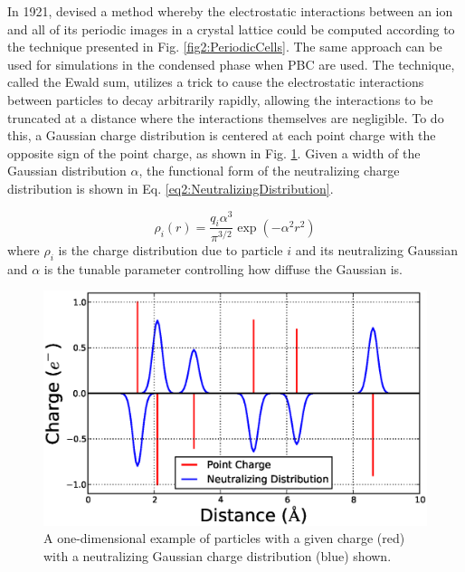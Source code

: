 In 1921, \citeauthor{Ewald_AnnPhys_1921_v64_p253} devised a method whereby the
electrostatic interactions between an ion and all of its periodic images in a
crystal lattice could be computed according to the technique presented in Fig.
\ref{fig2:PeriodicCells}. \cite{Ewald_AnnPhys_1921_v64_p253} The same approach
can be used for simulations in the condensed phase when PBC are used.  The
technique, called the Ewald sum, utilizes a trick to cause the electrostatic
interactions between particles to decay arbitrarily rapidly, allowing the
interactions to be truncated at a distance where the interactions themselves are
negligible. To do this, a Gaussian charge distribution is centered at each point
charge with the opposite sign of the point charge, as shown in Fig.
\ref{fig2:Ewald}. Given a width of the Gaussian distribution $\alpha$, the
functional form of the neutralizing charge distribution is shown in Eq.
\ref{eq2:NeutralizingDistribution}.

\begin{equation}
   \rho_i(r) = \frac{q_i \alpha ^ 3} {\pi ^ {3/2}} \exp \left( -\alpha ^ 2 r^2
               \right)
   \label{eq2:NeutralizingDistribution}
\end{equation}
where $\rho_i$ is the charge distribution due to particle $i$ and its
neutralizing Gaussian and $\alpha$ is the tunable parameter controlling how
diffuse the Gaussian is.

\begin{figure}
   \includegraphics[width=6.5in]{Ewald.ps}
   \caption{A one-dimensional example of particles with a given charge (red)
            with a neutralizing Gaussian charge distribution (blue) shown.}
   \label{fig2:Ewald}
\end{figure}

